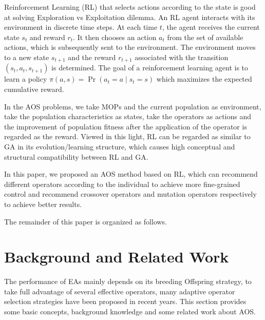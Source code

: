 \documentclass[journal]{IEEEtran}
\newcommand{\TODO}[1]{\textcolor[rgb]{1.00,0.40,0.22}{#1}}
\begin{document}
Reinforcement Learning (RL) that selects actions according to the state is good at solving Exploration vs Exploitation dilemma.
An RL agent interacts with its environment in discrete time steps. At each time $t$, the agent receives the current state $s_t$ and reward $r_t$. It then chooses an action $a_t$ from the set of available actions, which is subsequently sent to the environment. The environment moves to a new state $s_{t+1}$ and the reward $r_{t+1}$ associated with the transition $(s_t, a_t, s_{t+1})$ is determined. The goal of a reinforcement learning agent is to learn a policy $\pi(a, s)=\operatorname{Pr}\left(a_{t}=a \mid s_{t}=s\right)$ which maximizes the expected cumulative reward.

In the AOS problems, we take MOPs and the current population as environment, take the population characteristics as states, take the operators as actions and the improvement of population fitness after the application of the operator is regarded as the reward.
Viewed in this light, RL can be regarded as similar to GA in its evolution/learning structure, which causes high conceptual and structural compatibility between RL and GA.

In this paper, we proposed an AOS method based on RL, which can recommend different operators according to the individual to achieve more fine-grained control and recommend crossover operators and mutation operators respectively to achieve better results.

\TODO{The remainder of this paper is organized as follows.}

\IEEEpubidadjcol

\section{Background and Related Work}
The performance of EAs mainly depends on its breeding Offspring strategy, to take full advantage of several effective operators, many adaptive operator selection strategies have been proposed in recent years.
This section provides some basic concepts, background knowledge and some related work about AOS.
\end{document}
